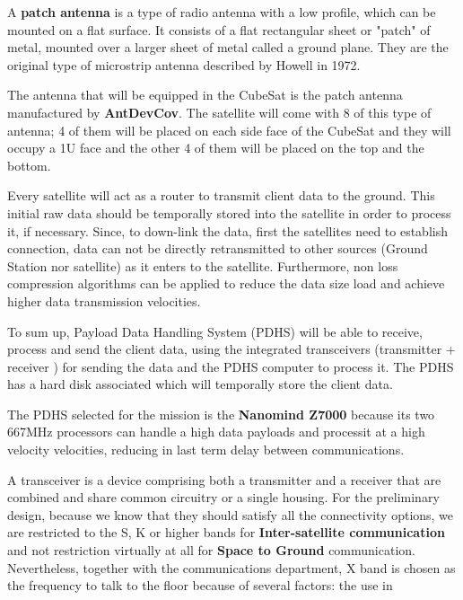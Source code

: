 A \textbf{patch antenna} is a type of radio antenna with a low profile, which can be mounted on a flat surface. It consists of a flat rectangular sheet or "patch" of metal, mounted over a larger sheet of metal called a ground plane. They are the original type of microstrip antenna described by Howell in 1972. \cite{patch}

The antenna that will be equipped in the CubeSat is the patch antenna manufactured by \textbf{AntDevCov}. The satellite will come with 8 of this type of antenna; 4 of them will be placed on each side face of the CubeSat and they will occupy a 1U face and the other 4 of them will be placed on the top and the bottom.

Every satellite will act as a router to transmit client data to the ground. This initial raw data should be temporally stored into the satellite in order to process it, if necessary. Since, to down-link the data, first the satellites need to establish connection, data can not be directly retransmitted to other sources (Ground Station nor satellite) as it enters to the satellite. Furthermore, non loss compression algorithms can be applied to reduce the data size load and achieve higher data transmission velocities.

To sum up, Payload Data Handling System (PDHS) will be able to receive, process and send the client data, using the integrated transceivers (transmitter + receiver )  for sending the data and the PDHS computer to process it. The PDHS has a hard disk associated which will temporally store the client data.

The PDHS selected for the mission is the \textbf{Nanomind Z7000} because its two 667MHz processors can handle a high data payloads and processit at a high velocity velocities, reducing in last term delay between communications. 

A transceiver is a device comprising both a transmitter and a receiver that are combined and share common circuitry or a single housing. For the preliminary design, because we know that they should satisfy all the connectivity options, we are restricted to the S, K or higher bands for \textbf{Inter-satellite communication} and not restriction virtually at all for \textbf{Space to Ground} communication. Nevertheless, together with the communications department, X band is chosen as the frequency to talk to the floor because of several factors: the use in 

